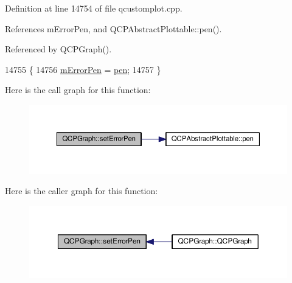 Definition at line 14754 of file qcustomplot.\+cpp.



References m\+Error\+Pen, and Q\+C\+P\+Abstract\+Plottable\+::pen().



Referenced by Q\+C\+P\+Graph().


\begin{DoxyCode}
14755 \{
14756   \hyperlink{class_q_c_p_graph_aa35681a24165c2831301091a87b662ce}{mErrorPen} = \hyperlink{class_q_c_p_abstract_plottable_a41d060007cc6b3037c9c04d22d0c0398}{pen};
14757 \}
\end{DoxyCode}


Here is the call graph for this function\+:\nopagebreak
\begin{figure}[H]
\begin{center}
\leavevmode
\includegraphics[width=350pt]{class_q_c_p_graph_abd4c7f81939e10776ea64603a704f22a_cgraph}
\end{center}
\end{figure}




Here is the caller graph for this function\+:\nopagebreak
\begin{figure}[H]
\begin{center}
\leavevmode
\includegraphics[width=350pt]{class_q_c_p_graph_abd4c7f81939e10776ea64603a704f22a_icgraph}
\end{center}
\end{figure}


\hypertarget{class_q_c_p_graph_ac3614d799c3894f2bc646e99c7f73d38}{}
